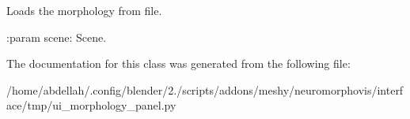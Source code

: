 \begin{DoxyVerb}Loads the morphology from file.

:param scene: Scene.
\end{DoxyVerb}
 

The documentation for this class was generated from the following file\+:\begin{DoxyCompactItemize}
\item 
/home/abdellah/.\+config/blender/2./scripts/addons/meshy/neuromorphovis/interface/tmp/ui\+\_\+morphology\+\_\+panel.\+py\end{DoxyCompactItemize}
